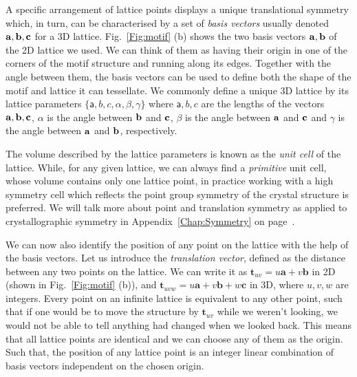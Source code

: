 A specific arrangement of lattice points displays a unique translational symmetry which, in turn, can be characterised by a set of \textit{basis vectors} usually denoted $\vb{a}, \vb{b}, \vb{c}$ for a 3D lattice. Fig.~\ref{Fig:motif} (b) shows the two basis vectors $\vb{a}, \vb{b}$ of the 2D lattice we used. We can think of them as having their origin in one of the corners of the motif structure and running along its edges. Together with the angle between them, the basis vectors can be used to define both the shape of the motif and lattice it can tessellate. We commonly define a unique 3D lattice by its lattice parameters $\{\mathsf{a}, b, c, \alpha, \beta, \gamma\}$ where $\mathsf{a}, b, c$ are the lengths of the vectors $\vb{a}, \vb{b}, \vb{c}$, $\alpha$ is the angle between $\vb{b}$ and $\vb{c}$, $\beta$ is the angle between $\vb{a}$ and $\vb{c}$ and $\gamma$ is the angle between $\vb{a}$ and $\vb{b}$, respectively. 

The volume described by the lattice parameters is known as the \textit{unit cell} of the lattice. While, for any given lattice, we can always find a \textit{primitive} unit cell, whose volume contains only one lattice point, in practice working with a high symmetry cell which reflects the point group symmetry of the crystal structure is preferred. We will talk more about point and translation symmetry as applied to crystallographic symmetry in Appendix~\ref{Chap:Symmetry} on page~\pageref{Chap:Symmetry}.

We can now also identify the position of any point on the lattice with the help of the basis vectors. Let us introduce the \textit{translation vector}, defined as the distance between any two points on the lattice. We can write it as $\mathbf{t}_{uv}=u\mathbf{a}+v\mathbf{b}$ in 2D (shown in Fig.~\ref{Fig:motif} (b)), and $\mathbf{t}_{uvw}=u\mathbf{a}+v\mathbf{b}+w\mathbf{c}$ in 3D, where $u, v, w$ are integers. Every point on an infinite lattice is equivalent to any other point, such that if one would be to move the structure by $\mathbf{t}_{uv}$ while we weren't looking, we would not be able to tell anything had changed when we looked back. This means that all lattice points are identical and we can choose any of them as the origin. Such that, the position of any lattice point is an integer linear combination of basis vectors independent on the chosen origin.

\vspace{0.4cm}

